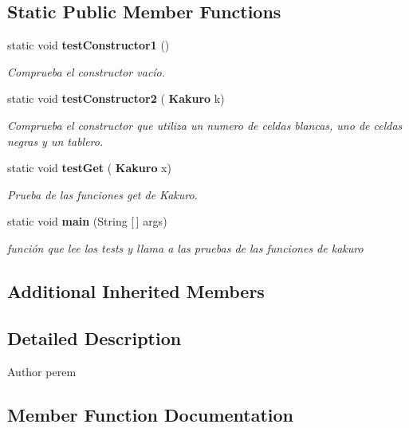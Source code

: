 \subsection*{Static Public Member Functions}
\begin{DoxyCompactItemize}
\item 
static void \textbf{ test\+Constructor1} ()
\begin{DoxyCompactList}\small\item\em Comprueba el constructor vacío. \end{DoxyCompactList}\item 
static void \textbf{ test\+Constructor2} (\textbf{ Kakuro} k)
\begin{DoxyCompactList}\small\item\em Comprueba el constructor que utiliza un numero de celdas blancas, uno de celdas negras y un tablero. \end{DoxyCompactList}\item 
static void \textbf{ test\+Get} (\textbf{ Kakuro} x)
\begin{DoxyCompactList}\small\item\em Prueba de las funciones get de Kakuro. \end{DoxyCompactList}\item 
static void \textbf{ main} (String [$\,$] args)
\begin{DoxyCompactList}\small\item\em función que lee los tests y llama a las pruebas de las funciones de kakuro \end{DoxyCompactList}\end{DoxyCompactItemize}
\subsection*{Additional Inherited Members}


\subsection{Detailed Description}
\begin{DoxyAuthor}{Author}
perem 
\end{DoxyAuthor}


\subsection{Member Function Documentation}
\mbox{\label{class_dominio_1_1controladores_1_1_drivers_1_1_driver_kakuro_a31b15a500be1892e96d81c271adffacb}} 
